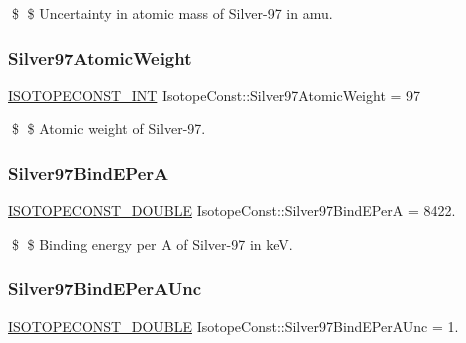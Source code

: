 \$ \$ Uncertainty in atomic mass of Silver-\/97 in amu. \mbox{\label{group___isotope_const-_silver-_ag97_ga7efb7c9cbfea5220f7ab8aba73f822be}} 
\subsubsection{\texorpdfstring{Silver97\+Atomic\+Weight}{Silver97AtomicWeight}}
{\footnotesize\ttfamily \mbox{\hyperlink{group___isotope_const-_macros_ga5f18360b3e99483a35c32d789e62621c}{I\+S\+O\+T\+O\+P\+E\+C\+O\+N\+S\+T\+\_\+\+I\+NT}} Isotope\+Const\+::\+Silver97\+Atomic\+Weight = 97}

\$ \$ Atomic weight of Silver-\/97. \mbox{\label{group___isotope_const-_silver-_ag97_ga761c3769db3aa647aae255f971422375}} 
\subsubsection{\texorpdfstring{Silver97\+Bind\+E\+PerA}{Silver97BindEPerA}}
{\footnotesize\ttfamily \mbox{\hyperlink{group___isotope_const-_macros_ga8f45a7272ce02c0b4c65c44636ed719a}{I\+S\+O\+T\+O\+P\+E\+C\+O\+N\+S\+T\+\_\+\+D\+O\+U\+B\+LE}} Isotope\+Const\+::\+Silver97\+Bind\+E\+PerA = 8422.}

\$ \$ Binding energy per A of Silver-\/97 in keV. \mbox{\label{group___isotope_const-_silver-_ag97_gaddfe0c7838d84f7be9f44aabfd993d69}} 
\subsubsection{\texorpdfstring{Silver97\+Bind\+E\+Per\+A\+Unc}{Silver97BindEPerAUnc}}
{\footnotesize\ttfamily \mbox{\hyperlink{group___isotope_const-_macros_ga8f45a7272ce02c0b4c65c44636ed719a}{I\+S\+O\+T\+O\+P\+E\+C\+O\+N\+S\+T\+\_\+\+D\+O\+U\+B\+LE}} Isotope\+Const\+::\+Silver97\+Bind\+E\+Per\+A\+Unc = 1.}

